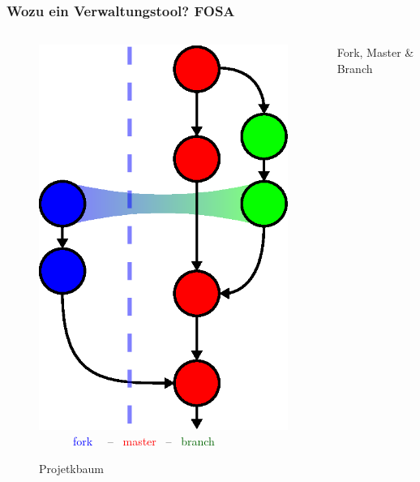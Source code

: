 \begin{frame}
	\frametitle{Wozu ein Verwaltungstool?\hfill{} \footnotesize{FOSA}}
	\begin{columns}
		\begin{column}{5cm}
			\begin{figure}
				\includegraphics[scale=0.5]{fig/git_tree.eps}\\
				\textcolor{blue}{~~~~~~fork~~} -- 
				\textcolor{red}{~master~} -- 
				\textcolor{darkgreen}{~branch}
				\caption{Projetkbaum}
			\end{figure}
		\end{column}
		\begin{column}{5cm}
			\begin{block}{Fork, Master \& Branch}
				\begin{itemize}

\end{itemize}
\end{block}
\end{column}
\end{columns}
\end{frame}
